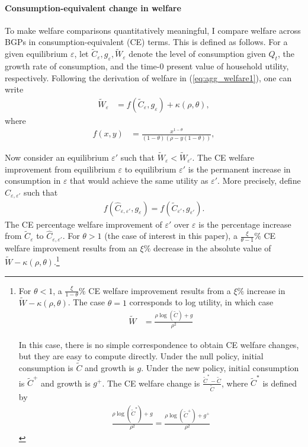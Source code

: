 \documentclass[ecta,nameyear,final]{econsocart}
\theoremstyle{plain}
\theoremstyle{remark}
\begin{document}
\paragraph{Consumption-equivalent change in welfare} 

To make welfare comparisons quantitatively meaningful, I compare welfare across BGPs in consumption-equivalent (CE) terms. This is defined as follows. For a given equilibrium $\varepsilon$, let $\tilde{C}_{\varepsilon}, g_{\varepsilon}, \tilde{W}_{\varepsilon}$ denote the level of consumption given $Q_t$, the growth rate of consumption, and the time-0 present value of household utility, respectively. Following the derivation of welfare in (\ref{eq:agg_welfare1}), one can write
\begin{align}
	\tilde{W}_{\varepsilon} &= f(\tilde{C}_{\varepsilon}, g_{\varepsilon}) + \kappa(\rho, \theta),
\end{align}
where
\begin{align}
	f(x,y) &= \frac{x^{1-\theta}}{(1-\theta) (\rho - y(1-\theta))},
\end{align}

Now consider an equilibrium $\varepsilon'$ such that $\tilde{W}_{\varepsilon} < \tilde{W}_{\varepsilon'}$. The CE welfare improvement from equilibrium $\varepsilon$ to equilibrium $\varepsilon'$ is the permanent increase in consumption in $\varepsilon$ that would achieve the same utility as $\varepsilon'$. More precisely, define $\hat{C}_{\varepsilon, \varepsilon'}$ such that
\begin{align}
	f(\hat{C}_{\varepsilon, \varepsilon'}, g_{\varepsilon}) = f(\tilde{C}_{\varepsilon'} , g_{\varepsilon'} ).
\end{align}
The CE percentage welfare improvement of $\varepsilon'$ over $\varepsilon$ is the percentage increase from $\tilde{C}_{\varepsilon}$ to $\hat{C}_{\varepsilon, \varepsilon'}$. For $\theta > 1$ (the case of interest in this paper), a $\frac{\xi}{\theta-1}\%$ CE welfare improvement results from an $\xi\%$ decrease in the absolute value of $\tilde{W} - \kappa(\rho ,\theta)$.\footnote{For $\theta < 1$, a $\frac{\xi}{1-\theta}\%$ CE welfare improvement results from a $\xi\%$ increase in $\tilde{W} - \kappa(\rho, \theta)$. The case $\theta = 1$ corresponds to log utility, in which case
	\begin{align}
		\tilde{W} &= \frac{\rho \log(\tilde{C}) + g}{\rho^2} \label{eq:agg_welfare_log}
	\end{align}
	
	In this case, there is no simple correspondence to obtain CE welfare changes, but they are easy to compute directly. Under the null policy, initial consumption is $\tilde{C}$ and growth is $g$. Under the new policy, initial consumption is $\tilde{C}^+$ and growth is $g^+$. The CE welfare change is $\frac{\tilde{C}^* - \tilde{C}}{\tilde{C}}$, where $\tilde{C}^*$ is defined by 
	\begin{align}
		\frac{\rho\log(\tilde{C}^*) + g}{\rho^2} = \frac{\rho \log(\tilde{C}^+) + g^+}{\rho^2} \label{eq:agg_welfare_log_CE}
\end{align}}
\end{document}
